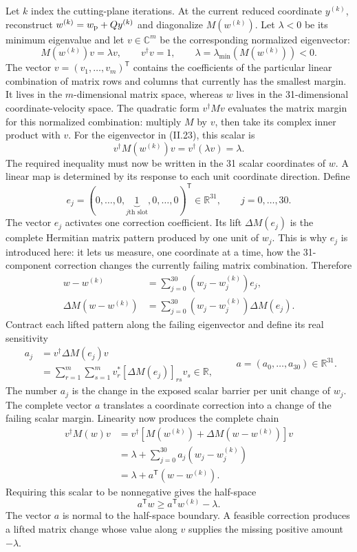 \documentclass[10pt,letterpaper,twocolumn]{article}
\newcommand{\R}{\mathbb R}
\newcommand{\C}{\mathbb C}
\begin{document}
Let \(k\) index the cutting-plane iterations.  At the current reduced
coordinate \(y^{(k)}\), reconstruct
\(w^{(k)}=w_{\rm p}+Qy^{(k)}\) and diagonalize \(M(w^{(k)})\).  Let
\(\lambda<0\) be its minimum eigenvalue and let \(v\in\C^m\) be the
corresponding normalized eigenvector:
\[
M(w^{(k)})v=\lambda v,
\qquad v^\dagger v=1,
\qquad \lambda=\lambda_{\min}(M(w^{(k)}))<0.
\tag{II.23}
\]
The vector \(v=(v_1,\ldots,v_m)^{\mathsf T}\) contains the coefficients of
the particular linear combination of matrix rows and columns that currently
has the smallest margin.  It lives in the \(m\)-dimensional matrix space,
whereas \(w\) lives in the 31-dimensional coordinate-velocity space.  The
quadratic form \(v^\dagger Mv\) evaluates the matrix margin for this normalized
combination: multiply \(M\) by \(v\), then take its complex inner product with
\(v\).  For the eigenvector in (II.23), this scalar is
\[
v^\dagger M(w^{(k)})v
=v^\dagger(\lambda v)
=\lambda.
\tag{II.23a}
\]
The required inequality must now be written in the 31 scalar coordinates of
\(w\).  A linear map is determined by its response to each unit coordinate
direction.  Define
\[
e_j=(0,\ldots,0,\underbrace{1}_{j\text{th slot}},0,\ldots,0)^{\mathsf T}
\in\R^{31},
\qquad j=0,\ldots,30.
\tag{II.24}
\]
The vector \(e_j\) activates one correction coefficient.  Its lift
\(\Delta M(e_j)\) is the complete Hermitian matrix pattern produced by one
unit of \(w_j\).  This is why \(e_j\) is introduced here: it lets us measure,
one coordinate at a time, how the 31-component correction changes the
currently failing matrix combination.  Therefore
\[
\begin{aligned}
w-w^{(k)}
&=\sum_{j=0}^{30}(w_j-w_j^{(k)})e_j,\\
\Delta M(w-w^{(k)})
&=\sum_{j=0}^{30}(w_j-w_j^{(k)})\Delta M(e_j).
\end{aligned}
\tag{II.24a}
\]
Contract each lifted pattern along the failing eigenvector and define its real
sensitivity
\[
\begin{aligned}
a_j
&=v^\dagger\Delta M(e_j)v\\
&=\sum_{r=1}^{m}\sum_{s=1}^{m}
v_r^*[\Delta M(e_j)]_{rs}v_s\in\R,
\end{aligned}
\qquad
a=(a_0,\ldots,a_{30})\in\R^{31}.
\tag{II.24b}
\]
The number \(a_j\) is the change in the exposed scalar barrier per unit change
of \(w_j\).  The complete vector \(a\) translates a coordinate correction
into a change of the failing scalar margin.  Linearity now produces the
complete chain
\[
\begin{aligned}
v^\dagger M(w)v
&=v^\dagger\!\left[
M(w^{(k)})+\Delta M(w-w^{(k)})
\right]v\\
&=\lambda+
\sum_{j=0}^{30}a_j(w_j-w_j^{(k)})\\
&=\lambda+a^{\mathsf T}(w-w^{(k)}).
\end{aligned}
\tag{II.25}
\]
Requiring this scalar to be nonnegative gives the half-space
\[
a^{\mathsf T}w
\geq a^{\mathsf T}w^{(k)}-\lambda.
\tag{II.25a}
\]
The vector \(a\) is normal to the half-space boundary.  A feasible correction
produces a lifted matrix change whose value along \(v\) supplies the missing
positive amount \(-\lambda\).
\end{document}
